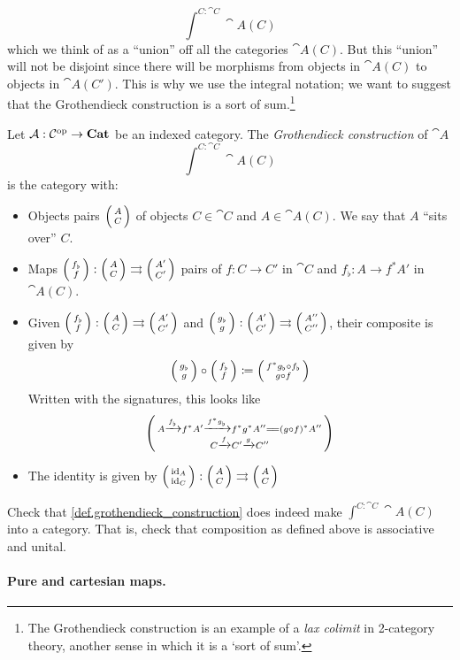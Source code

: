 \documentclass[DynamicalBook]{subfiles}
\begin{document}
$$\int^{C : \cat{C}} \cat{A}(C)$$
which we think of as a ``union'' off all the categories $\cat{A}(C)$. But this
``union'' will not be
disjoint since there will be morphisms from objects in $\cat{A}(C)$ to objects
in $\cat{A}(C')$. This is why we use the integral notation; we want to suggest
that the Grothendieck construction is a sort of sum.\footnote{The Grothendieck
  construction is an example of a \emph{lax colimit} in 2-category theory,
  another sense in which it is a `sort of sum'.}
\begin{definition}\label{def.grothendieck_construction}
  Let $\mathcal{A} : \mathcal{C}^{\textnormal{op}} \to \textbf{Cat}$ be an indexed category. The
  \emph{Grothendieck construction} of $\cat{A}$
  $$\int^{C : \cat{C}} \cat{A}(C)$$
  is the category with:
  \begin{itemize}
    \item Objects pairs $\lens{A}{C}$ of objects $C \in \cat{C}$ and $A \in
      \cat{A}(C)$. We say that $A$ ``sits over'' $C$.
    \item Maps $\lens{f_{\flat}}{f} : \lens{A}{C} \rightrightarrows
      \lens{A'}{C'}$ pairs of $f : C \to C'$ in $\cat{C}$ and $f_{\flat} :
      A \to f^{\ast}A'$ in $\cat{A}(C)$.
    \item Given $\lens{f_{\flat}}{f} : \lens{A}{C} \rightrightarrows
      \lens{A'}{C'}$ and $\lens{g_{\flat}}{g} : \lens{A'}{C'} \rightrightarrows
      \lens{A''}{C''}$, their composite is given by
      $$\lens{g_{\flat}}{g} \circ \lens{f_{\flat}}{f} \coloneqq \lens{f^{\ast}g_{\flat}
      \circ f_{\flat}}{g \circ f}$$
    Written with the signatures, this looks like
    $$\lens{A \xto{f_{\flat}} f^{\ast}A' \xto{f^{\ast}g_{\flat}}
      f^{\ast}g^{\ast}A'' \xequals{\phantom{\gamma}} (g \circ f)^\ast A''}{C \xto{f} C' \xto{g} C''}$$
    \item The identity is given by $\lens{\id_A}{\id_C} : \lens{A}{C}
      \rightrightarrows \lens{A}{C}$
  \end{itemize}
\end{definition}

\begin{exercise}
  Check that \cref{def.grothendieck_construction} does indeed make $\int^{C :
    \cat{C}} \cat{A}(C)$ into a category. That is, check that composition as
  defined above is associative and unital.
\end{exercise}

\paragraph{Pure and cartesian maps.}\label{sec.pure_and_cartesian_maps}
\end{document}
